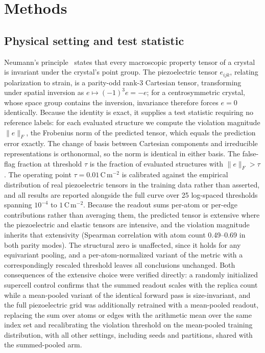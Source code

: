 \section*{Methods}

\subsection*{Physical setting and test statistic}

Neumann's principle~\cite{nye1985crystals} states that every macroscopic property tensor of a crystal is invariant under the crystal's point group. The piezoelectric tensor $e_{ijk}$, relating polarization to strain, is a parity-odd rank-3 Cartesian tensor, transforming under spatial inversion as $e \mapsto (-1)^{3} e = -e$; for a centrosymmetric crystal, whose space group contains the inversion, invariance therefore forces $e = 0$ identically. Because the identity is exact, it supplies a test statistic requiring no reference labels: for each evaluated structure we compute the violation magnitude $\lVert e \rVert_F$, the Frobenius norm of the predicted tensor, which equals the prediction error exactly. The change of basis between Cartesian components and irreducible representations is orthonormal, so the norm is identical in either basis. The false-flag fraction at threshold $\tau$ is the fraction of evaluated structures with $\lVert e \rVert_F > \tau$. The operating point $\tau = 0.01$\,C\,m$^{-2}$ is calibrated against the empirical distribution of real piezoelectric tensors in the training data rather than asserted, and all results are reported alongside the full curve over 25 log-spaced thresholds spanning $10^{-4}$ to $1$\,C\,m$^{-2}$. Because the readout sums per-atom or per-edge contributions rather than averaging them, the predicted tensor is extensive where the piezoelectric and elastic tensors are intensive, and the violation magnitude inherits that extensivity (Spearman correlation with atom count 0.49--0.69 in both parity modes). The structural zero is unaffected, since it holds for any equivariant pooling, and a per-atom-normalized variant of the metric with a correspondingly rescaled threshold leaves all conclusions unchanged. Both consequences of the extensive choice were verified directly: a randomly initialized supercell control confirms that the summed readout scales with the replica count while a mean-pooled variant of the identical forward pass is size-invariant, and the full piezoelectric grid was additionally retrained with a mean-pooled readout, replacing the sum over atoms or edges with the arithmetic mean over the same index set and recalibrating the violation threshold on the mean-pooled training distribution, with all other settings, including seeds and partitions, shared with the summed-pooled arm.

